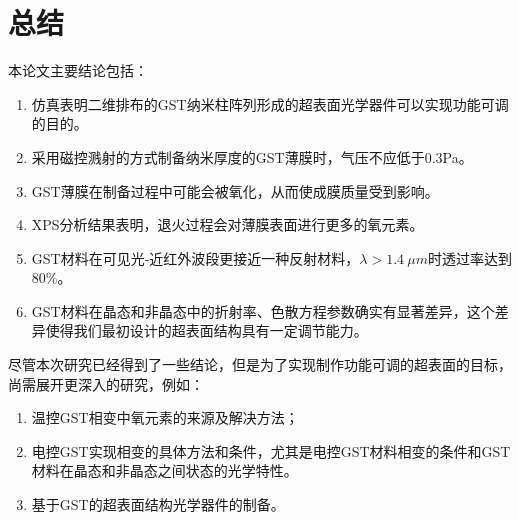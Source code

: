 \chapter{总结}
\label{chap:04}

本论文主要结论包括：
\begin{enumerate}
	\item 仿真表明二维排布的GST纳米柱阵列形成的超表面光学器件可以实现功能可调的目的。
	\item 采用磁控溅射的方式制备纳米厚度的GST薄膜时，气压不应低于0.3Pa。
	\item GST薄膜在制备过程中可能会被氧化，从而使成膜质量受到影响。
	\item XPS分析结果表明，退火过程会对薄膜表面进行更多的氧元素。
	\item GST材料在可见光-近红外波段更接近一种反射材料，$\lambda > 1.4\ \mu m$时透过率达到80\%。
	\item GST材料在晶态和非晶态中的折射率、色散方程参数确实有显著差异，这个差异使得我们最初设计的超表面结构具有一定调节能力。
\end{enumerate}

尽管本次研究已经得到了一些结论，但是为了实现制作功能可调的超表面的目标，尚需展开更深入的研究，例如：
\begin{enumerate}
	\item 温控GST相变中氧元素的来源及解决方法；
	\item 电控GST实现相变的具体方法和条件，尤其是电控GST材料相变的条件\cite{nature1}和GST材料在晶态和非晶态之间状态的光学特性\cite{middle}。
	\item 基于GST的超表面结构光学器件的制备。
\end{enumerate}


